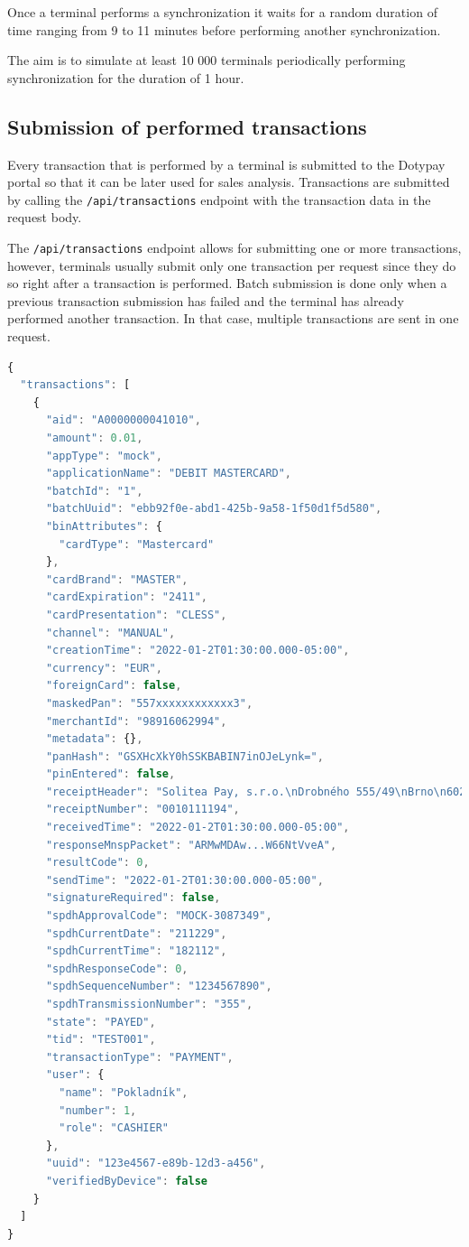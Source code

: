 \documentclass[12pt, a4paper]{article}
\begin{document}
Once a terminal performs a synchronization it waits for a random duration of time ranging from 9 to 11 minutes before performing another synchronization.

The aim is to simulate at least 10 000 terminals periodically performing synchronization for the duration of 1 hour.

\subsection{Submission of performed transactions}

Every transaction that is performed by a terminal is submitted to the Dotypay portal so that it can be later used for sales analysis.
Transactions are submitted by calling the \texttt{/api/transactions} endpoint with the transaction data in the request body.

The \texttt{/api/transactions} endpoint allows for submitting one or more transactions, however, terminals usually submit only one transaction per request since they do so right after a transaction is performed.
Batch submission is done only when a previous transaction submission has failed and the terminal has already performed another transaction.
In that case, multiple transactions are sent in one request.

\begin{lstlisting}[language=JavaScript, caption={Transaction submission request body},captionpos=b, basicstyle=\tiny]
{
  "transactions": [
    {
      "aid": "A0000000041010",
      "amount": 0.01,
      "appType": "mock",
      "applicationName": "DEBIT MASTERCARD",
      "batchId": "1",
      "batchUuid": "ebb92f0e-abd1-425b-9a58-1f50d1f5d580",
      "binAttributes": {
        "cardType": "Mastercard"
      },
      "cardBrand": "MASTER",
      "cardExpiration": "2411",
      "cardPresentation": "CLESS",
      "channel": "MANUAL",
      "creationTime": "2022-01-2T01:30:00.000-05:00",
      "currency": "EUR",
      "foreignCard": false,
      "maskedPan": "557xxxxxxxxxxxx3",
      "merchantId": "98916062994",
      "metadata": {},
      "panHash": "GSXHcXkY0hSSKBABIN7inOJeLynk=",
      "pinEntered": false,
      "receiptHeader": "Solitea Pay, s.r.o.\nDrobného 555/49\nBrno\n60200\nIČO: 25595091\nTID: TEST001   ",
      "receiptNumber": "0010111194",
      "receivedTime": "2022-01-2T01:30:00.000-05:00",
      "responseMnspPacket": "ARMwMDAw...W66NtVveA",
      "resultCode": 0,
      "sendTime": "2022-01-2T01:30:00.000-05:00",
      "signatureRequired": false,
      "spdhApprovalCode": "MOCK-3087349",
      "spdhCurrentDate": "211229",
      "spdhCurrentTime": "182112",
      "spdhResponseCode": 0,
      "spdhSequenceNumber": "1234567890",
      "spdhTransmissionNumber": "355",
      "state": "PAYED",
      "tid": "TEST001",
      "transactionType": "PAYMENT",
      "user": {
        "name": "Pokladník",
        "number": 1,
        "role": "CASHIER"
      },
      "uuid": "123e4567-e89b-12d3-a456",
      "verifiedByDevice": false
    }
  ]
}
\end{lstlisting}
\end{document}
